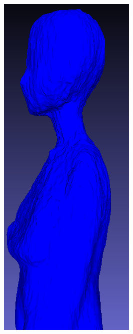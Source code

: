 \begin{figure}[H]
\begin{subfigure}[b]{0.106\textwidth}
        \caption{}
    \end{subfigure}
    \begin{subfigure}[b]{0.1289\textwidth}
        \centering
        \includegraphics[width=\textwidth]{figures/future/bias_teacher_magic3d.png}

\end{subfigure}
\end{figure}
